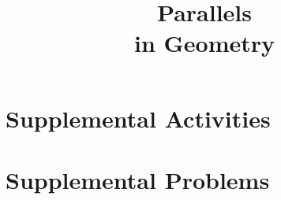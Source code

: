 \documentclass[justified,openany,nofonts]{tufte-book}
\title{Parallels \\ in Geometry}
\author{\teachingnotes}
\renewcommand{\theenumi}{$(\mathrm{\arabic{enumi}})$}
\renewcommand{\labelenumi}{\theenumi}
\begin{document}
\def\document#1{} %

\setcounter{tocdepth}{1}
\tableofcontents

\setcounter{secnumdepth}{2} %


%

%

\appendix

\renewcommand{\theenumi}{$(\mathrm{\alph{enumi}})$}
\renewcommand{\labelenumi}{\theenumi}
\chapter{Supplemental Activities}





































%
%
%




\chapter{Supplemental Problems}




\end{document}
